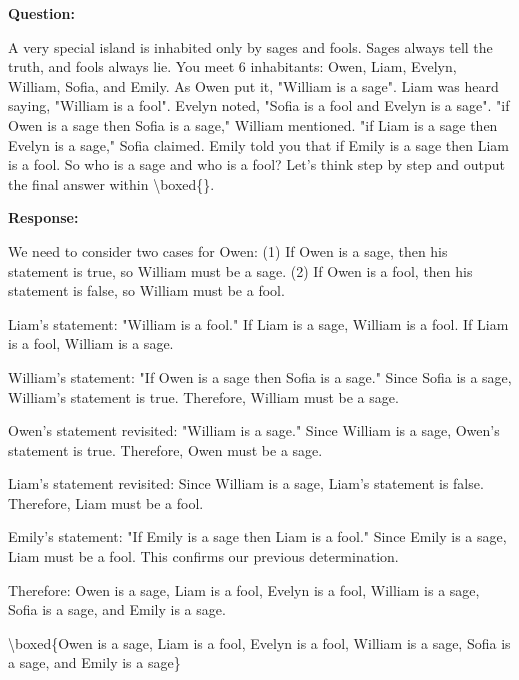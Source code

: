 \documentclass{article}
\theoremstyle{plain}
\theoremstyle{definition}
\theoremstyle{remark}
\begin{document}
\begin{tcolorbox}[
    colback=gray!5,
    colframe=gray!60,
    coltext=black,
    coltitle=white,
    title={Knights-and-Knaves},
    fonttitle=\small\bfseries,
    boxrule=0.4pt,
    arc=2mm,
    left=4pt, right=4pt, top=4pt, bottom=4pt
]

{\small\bfseries Question:}

{\ttfamily\small A very special island is inhabited only by sages and fools. Sages always tell the truth, and fools always lie. You meet 6 inhabitants: Owen, Liam, Evelyn, William, Sofia, and Emily. As Owen put it, "William is a sage". Liam was heard saying, "William is a fool". Evelyn noted, "Sofia is a fool and Evelyn is a sage". "if Owen is a sage then Sofia is a sage," William mentioned. "if Liam is a sage then Evelyn is a sage," Sofia claimed. Emily told you that if Emily is a sage then Liam is a fool. So who is a sage and who is a fool? Let's think step by step and output the final answer within \textbackslash boxed\{\}.}

{\small\bfseries Response:}

{\ttfamily\small We need to consider two cases for Owen: (1) If Owen is a sage, then his statement is true, so William must be a sage. (2) If Owen is a fool, then his statement is false, so William must be a fool.}

{\ttfamily\small Liam's statement: "William is a fool." If Liam is a sage, William is a fool. If Liam is a fool, William is a sage.}

{\ttfamily\small William's statement: "If Owen is a sage then Sofia is a sage." Since Sofia is a sage, William's statement is true. Therefore, William must be a sage.}

{\ttfamily\small Owen's statement revisited: "William is a sage." Since William is a sage, Owen's statement is true. Therefore, Owen must be a sage.}

{\ttfamily\small Liam's statement revisited: Since William is a sage, Liam's statement is false. Therefore, Liam must be a fool.}

{\ttfamily\small Emily's statement: "If Emily is a sage then Liam is a fool." Since Emily is a sage, Liam must be a fool. This confirms our previous determination.}

{\ttfamily\small Therefore: Owen is a sage, Liam is a fool, Evelyn is a fool, William is a sage, Sofia is a sage, and Emily is a sage.}

{\ttfamily\small \textbackslash boxed\{Owen is a sage, Liam is a fool, Evelyn is a fool, William is a sage, Sofia is a sage, and Emily is a sage\}}

\end{tcolorbox}
\end{document}
